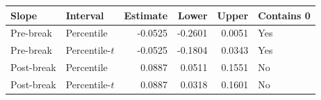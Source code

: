 \begin{tabular}{llrrrl}
\toprule
Slope & Interval & Estimate & Lower & Upper & Contains 0 \\
\midrule
Pre-break & Percentile & -0.0525 & -0.2601 & 0.0051 & Yes \\
Pre-break & Percentile-$t$ & -0.0525 & -0.1804 & 0.0343 & Yes \\
Post-break & Percentile & 0.0887 & 0.0511 & 0.1551 & No \\
Post-break & Percentile-$t$ & 0.0887 & 0.0318 & 0.1601 & No \\
\bottomrule
\end{tabular}
